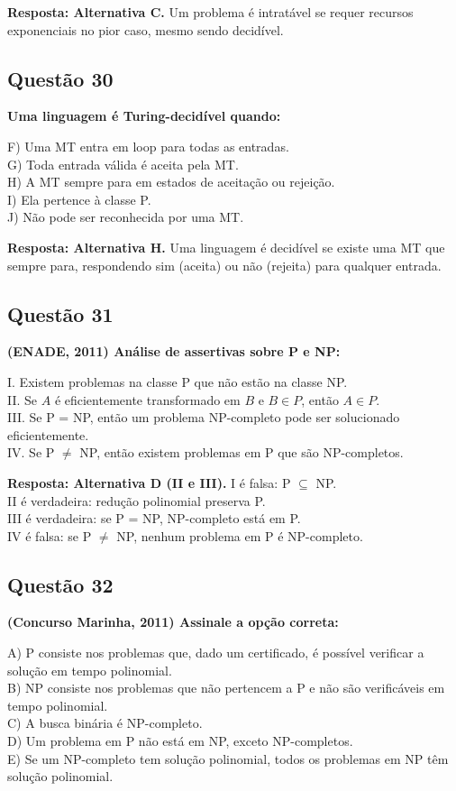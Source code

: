 \documentclass[conference]{IEEEtran}
\begin{document}
\textbf{Resposta: Alternativa C.} Um problema é intratável se requer recursos exponenciais no pior caso, mesmo sendo decidível.

\subsection{Questão 30}
\textbf{Uma linguagem é Turing-decidível quando:}

F) Uma MT entra em loop para todas as entradas. \\
G) Toda entrada válida é aceita pela MT. \\
H) A MT sempre para em estados de aceitação ou rejeição. \\
I) Ela pertence à classe P. \\
J) Não pode ser reconhecida por uma MT.

\textbf{Resposta: Alternativa H.} Uma linguagem é decidível se existe uma MT que sempre para, respondendo sim (aceita) ou não (rejeita) para qualquer entrada.

\subsection{Questão 31}
\textbf{(ENADE, 2011) Análise de assertivas sobre P e NP:}

I. Existem problemas na classe P que não estão na classe NP. \\
II. Se $A$ é eficientemente transformado em $B$ e $B \in P$, então $A \in P$. \\
III. Se P = NP, então um problema NP-completo pode ser solucionado eficientemente. \\
IV. Se P $\neq$ NP, então existem problemas em P que são NP-completos.

\textbf{Resposta: Alternativa D (II e III).}
I é falsa: P $\subseteq$ NP. \\
II é verdadeira: redução polinomial preserva P. \\
III é verdadeira: se P = NP, NP-completo está em P. \\
IV é falsa: se P $\neq$ NP, nenhum problema em P é NP-completo.

\subsection{Questão 32}
\textbf{(Concurso Marinha, 2011) Assinale a opção correta:}

A) P consiste nos problemas que, dado um certificado, é possível verificar a solução em tempo polinomial. \\
B) NP consiste nos problemas que não pertencem a P e não são verificáveis em tempo polinomial. \\
C) A busca binária é NP-completo. \\
D) Um problema em P não está em NP, exceto NP-completos. \\
E) Se um NP-completo tem solução polinomial, todos os problemas em NP têm solução polinomial.
\end{document}
